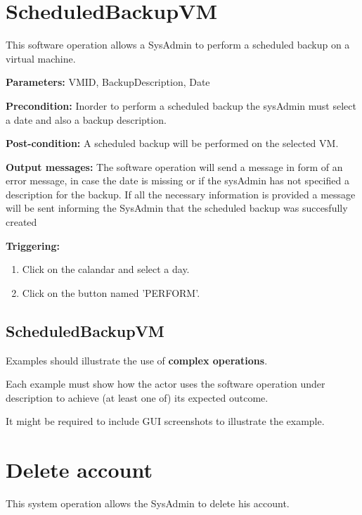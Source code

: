 \section{ScheduledBackupVM}
\label{operation:ScheduledBackupVM}
This software operation allows a SysAdmin to perform a scheduled backup on a
virtual machine.
\begin{description}

\item \textbf{Parameters:} VMID, BackupDescription, Date
\item \textbf{Precondition:} Inorder to perform a scheduled backup the sysAdmin 
must select a date and also a backup description.
\item \textbf{Post-condition:} A scheduled backup will be performed on the
selected VM.
\item \textbf{Output messages:} The software operation will send a message in
form of an error message, in case the date is missing or if the sysAdmin has 
not specified a description for the backup. If all the necessary information
is provided a message will be sent informing the SysAdmin that the scheduled 
backup was succesfully created


\item \textbf{Triggering:}
\begin{enumerate}
\item Click on the calandar and select a day.
\item Click on the button named 'PERFORM'.
\end{enumerate}

 
\end{description}


\subsection{ScheduledBackupVM}
Examples should illustrate the use of \textbf{complex operations}.

Each example must show how the actor uses the software operation under
description to achieve (at least one of) its expected outcome.

It might be required to include GUI screenshots to illustrate the example.



\section{Delete account}
\label{operation:ConfirmDelete}
This system operation allows the SysAdmin to delete his account.

